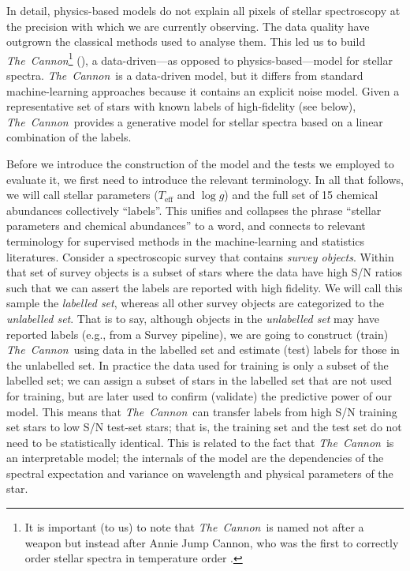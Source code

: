 \documentclass[12pt,preprint]{aastex}
\newcommand{\project}[1]{\textsl{#1}}
\newcommand{\TheCannon}{\project{The~Cannon}}
\newcommand{\logg}{\log g}
\newcommand{\Teff}{T_{\mathrm{eff}}}
\begin{document}
In detail, physics-based models do not explain all pixels of stellar 
spectroscopy at the precision with which we are currently observing.  The data
quality have outgrown the classical methods used to analyse them.  This led us 
to build \TheCannon\footnote{It is important (to us) to note that \TheCannon\ 
is named not after a weapon but instead after Annie Jump Cannon, who was the 
first to correctly order stellar spectra in temperature order \citep[and who did so
by looking at the data, and without any use of physics-based models, see][]{Cannon_1911}.} 
(\citealt{tc}), a data-driven---as opposed to physics-based---model for stellar
spectra.  \TheCannon\ is a data-driven model, but it differs from standard 
machine-learning approaches because it contains an explicit noise model. Given a
representative set of stars with known labels of high-fidelity (see below), 
\TheCannon\ provides a generative model for stellar spectra based on a linear 
combination of the labels.  


Before we introduce the construction of the model and the tests we employed to
evaluate it, we first need to introduce the relevant terminology.  In all that 
follows, we will call stellar parameters ($\Teff$ and $\logg$) and the full set
of 15 chemical abundances collectively ``labels''.  This unifies and collapses 
the phrase ``stellar parameters and chemical abundances'' to a word, and 
connects to relevant terminology for supervised methods in the machine-learning
and statistics literatures.  Consider a spectroscopic survey that contains 
\emph{survey objects}.  Within that set of survey objects is a subset of stars 
where the data have high S/N ratios such that we can assert the 
labels are reported with high fidelity.  We will call this sample the 
\emph{labelled set}, whereas all other survey objects are categorized to the
\emph{unlabelled set}.  That is to say, although objects in the 
\emph{unlabelled set} may have reported labels (e.g., from a Survey pipeline), we are going to construct
(train) \TheCannon\ using data in the labelled set and estimate (test) labels 
for those in the unlabelled set.  In practice the data used for training is
only a subset of the labelled set; we can assign a subset of stars in the labelled set
that are not used for training, but are later used to confirm (validate) the
predictive power of our model.  This means that \TheCannon\ can transfer 
labels from high S/N training set stars to low S/N 
test-set stars; that is, the training set and the test set do not need to be 
statistically identical.  This is related to the fact that \TheCannon\ is an 
interpretable model; the internals of the model are the dependencies of the 
spectral expectation and variance on wavelength and physical parameters of the 
star. 
\end{document}
